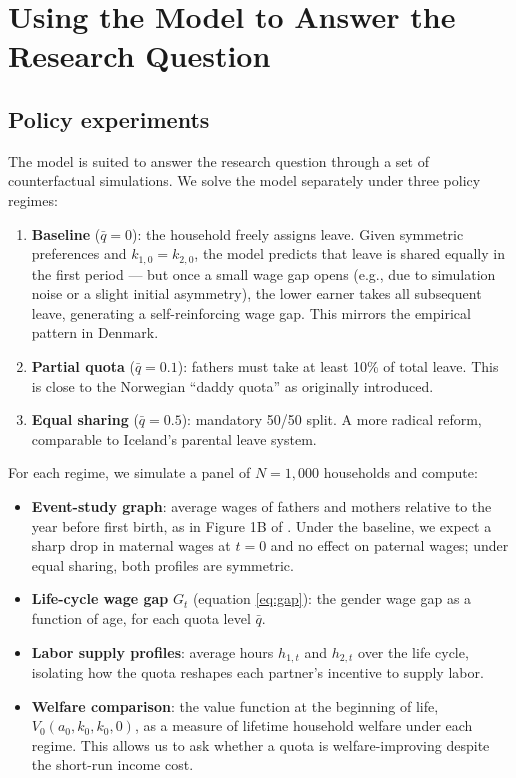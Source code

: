 \section{Using the Model to Answer the Research Question}

\subsection{Policy experiments}

The model is suited to answer the research question through a set of counterfactual simulations. We solve the model separately under three policy regimes:

\begin{enumerate}
    \item \textbf{Baseline} ($\bar{q} = 0$): the household freely assigns leave. Given symmetric preferences and $k_{1,0} = k_{2,0}$, the model predicts that leave is shared equally in the first period --- but once a small wage gap opens (e.g., due to simulation noise or a slight initial asymmetry), the lower earner takes all subsequent leave, generating a self-reinforcing wage gap. This mirrors the empirical pattern in Denmark.

    \item \textbf{Partial quota} ($\bar{q} = 0.1$): fathers must take at least 10\% of total leave. This is close to the Norwegian ``daddy quota'' as originally introduced.

    \item \textbf{Equal sharing} ($\bar{q} = 0.5$): mandatory 50/50 split. A more radical reform, comparable to Iceland's parental leave system.
\end{enumerate}

For each regime, we simulate a panel of $N = 1{,}000$ households and compute:

\begin{itemize}
    \item \textbf{Event-study graph}: average wages of fathers and mothers relative to the year before first birth, as in Figure 1B of \citet{kleven2019children}. Under the baseline, we expect a sharp drop in maternal wages at $t = 0$ and no effect on paternal wages; under equal sharing, both profiles are symmetric.

    \item \textbf{Life-cycle wage gap} $G_t$ (equation \ref{eq:gap}): the gender wage gap as a function of age, for each quota level $\bar{q}$.

    \item \textbf{Labor supply profiles}: average hours $h_{1,t}$ and $h_{2,t}$ over the life cycle, isolating how the quota reshapes each partner's incentive to supply labor.

    \item \textbf{Welfare comparison}: the value function at the beginning of life, $V_0(a_0, k_0, k_0, 0)$, as a measure of lifetime household welfare under each regime. This allows us to ask whether a quota is welfare-improving despite the short-run income cost.
\end{itemize}

